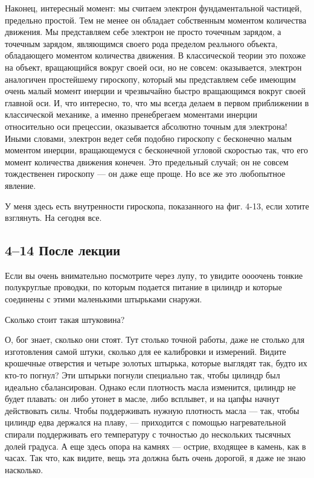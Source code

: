 \documentclass[11pt,oneside]{article}
\begin{document}
Наконец, интересный момент: мы считаем электрон фундаментальной частицей, предельно простой. Тем не менее он обладает собственным моментом количества движения. Мы представляем себе электрон не просто точечным зарядом, а точечным зарядом, являющимся своего рода пределом реального объекта, обладающего моментом количества движения. В классической теории это похоже на объект, вращающийся вокруг своей оси, но не совсем: оказывается, электрон аналогичен простейшему гироскопу, который мы представляем себе имеющим очень малый момент инерции и чрезвычайно быстро вращающимся вокруг своей главной оси. И, что интересно, то, что мы всегда делаем в первом приближении в классической механике, а именно пренебрегаем моментами инерции относительно оси прецессии, оказывается абсолютно точным для электрона! Иными словами, электрон ведет себя подобно гироскопу с бесконечно малым моментом инерции, вращающемуся с бесконечной угловой скоростью так, что его момент количества движения конечен. Это предельный случай; он не совсем тождественен гироскопу --- он даже еще проще. Но все же это любопытное явление.\par

У меня здесь есть внутренности гироскопа, показанного на фиг. 4-13, если хотите взглянуть. На сегодня все.\par

\subsection*{4--14 После лекции}

Если вы очень внимательно посмотрите через лупу, то увидите оооочень тонкие полукруглые проводки, по которым подается питание в цилиндр и которые соединены с этими маленькими штырьками снаружи.\par

Сколько стоит такая штуковина?\par

О, бог знает, сколько они стоят. Тут столько точной работы, даже не столько для изготовления самой штуки, сколько для ее калибровки и измерений. Видите крошечные отверстия и четыре золотых штырька, которые выглядят так, будто их кто-то погнул? Эти штырьки погнули специально так, чтобы цилиндр был идеально сбалансирован. Однако если плотность масла изменится, цилиндр не будет плавать: он либо утонет в масле, либо всплывет, и на цапфы начнут действовать силы. Чтобы поддерживать нужную плотность масла --- так, чтобы цилиндр едва держался на плаву, --- приходится с помощью нагревательной спирали поддерживать его температуру с точностью до нескольких тысячных долей градуса. А еще здесь опора на камнях --- острие, входящее в камень, как в часах. Так что, как видите, вещь эта должна быть очень дорогой, я даже не знаю насколько.\par
\end{document}
